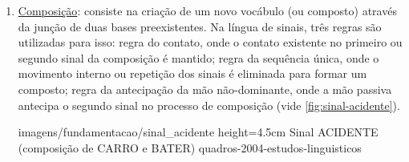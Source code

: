 \begin{enumerate}
\begin{enumerate}
        \item \underline{Composição}: consiste na criação de um novo vocábulo (ou composto) através da junção de duas bases preexistentes. Na língua de sinais, três regras são utilizadas para isso: regra do contato, onde o contato existente no primeiro ou segundo sinal da composição é mantido; regra da sequência única, onde o movimento interno ou repetição dos sinais é eliminada para formar um composto; regra da antecipação da mão não-dominante, onde a mão passiva antecipa o segundo sinal no processo de composição (vide \autoref{fig:sinal-acidente}).
        
        

            {imagens/fundamentacao/sinal_acidente} %
            {height=4.5cm} %
            {Sinal ACIDENTE (composição de CARRO e BATER)} %
            {quadros-2004-estudos-linguisticos} %





\end{enumerate}
\end{enumerate}
